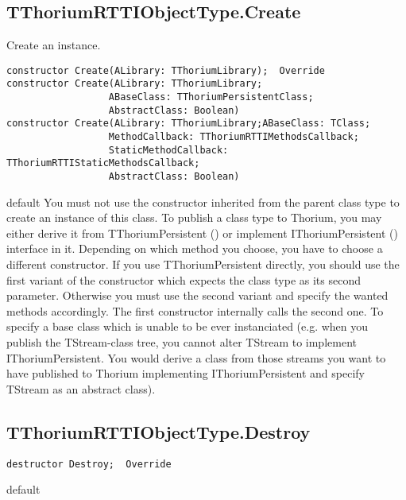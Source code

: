 \subsection{TThoriumRTTIObjectType.Create}
\label{thoriumcorepkg:thorium:tthoriumrttiobjecttype:create}
\begin{FPCList}
\Synopsis
Create an instance.\Declaration 

\begin{verbatim}
constructor Create(ALibrary: TThoriumLibrary);  Override
constructor Create(ALibrary: TThoriumLibrary;
                  ABaseClass: TThoriumPersistentClass;
                  AbstractClass: Boolean)
constructor Create(ALibrary: TThoriumLibrary;ABaseClass: TClass;
                  MethodCallback: TThoriumRTTIMethodsCallback;
                  StaticMethodCallback: TThoriumRTTIStaticMethodsCallback;
                  AbstractClass: Boolean)
\end{verbatim}
\Visibility
default
\Description
You must not use the constructor inherited from the parent class type to create an instance of this class.  To publish a class type to Thorium, you may either derive it from TThoriumPersistent (\pageref{thoriumcorepkg:thorium:tthoriumpersistent}) or implement IThoriumPersistent (\pageref{thoriumcorepkg:thorium:ithoriumpersistent}) interface in it. Depending on which method you choose, you have to choose a different constructor. If you use TThoriumPersistent directly, you should use the first variant of the constructor which expects the class type as its second parameter. Otherwise you must use the second variant and specify the wanted methods accordingly. The first constructor internally calls the second one.  To specify a base class which is unable to be ever instanciated (e.g. when you publish the TStream-class tree, you cannot alter TStream to implement IThoriumPersistent. You would derive a class from those streams you want to have published to Thorium implementing IThoriumPersistent and specify TStream as an abstract class).\end{FPCList}
\subsection{TThoriumRTTIObjectType.Destroy}
\label{thoriumcorepkg:thorium:tthoriumrttiobjecttype:destroy}
\begin{FPCList}
\Declaration 

\begin{verbatim}
destructor Destroy;  Override
\end{verbatim}
\Visibility
default
\end{FPCList}
